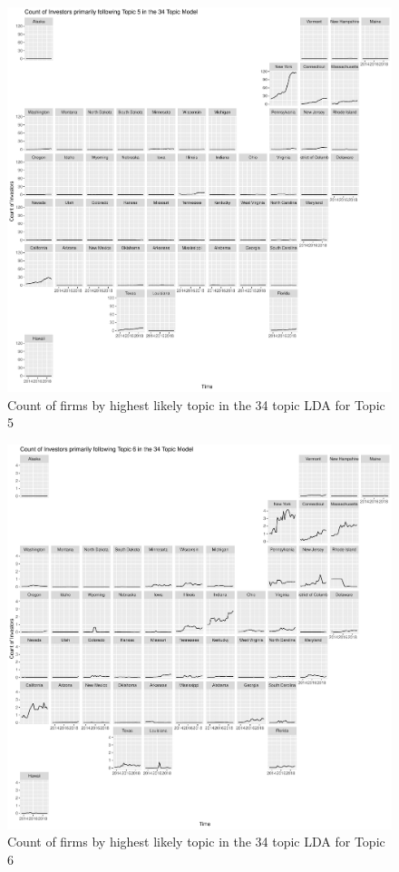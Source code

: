 		\begin{figure}
		\centering
		\includegraphics[width=1\linewidth]{Figures/ChapterV/USA_34_Topic05.pdf}
		\caption[Count of Firms for Topic 5 by Quarter]{Count of firms by highest likely topic in the 34 topic LDA for Topic 5}
		\label{fig:StateLDA5}
	\end{figure}
	
		\begin{figure}
		\centering
		\includegraphics[width=1\linewidth]{Figures/ChapterV/USA_34_Topic06.pdf}
		\caption[Count of Firms for Topic 6 by Quarter]{Count of firms by highest likely topic in the 34 topic LDA for Topic 6}
		\label{fig:StateLDA6}
	\end{figure}
	
